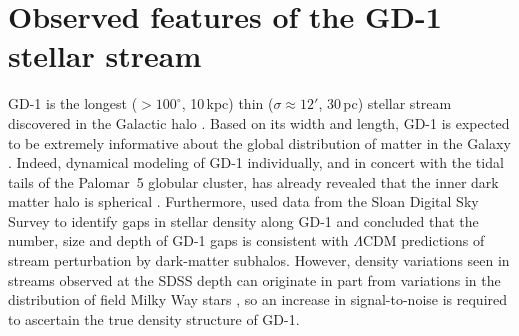 \documentclass[twocolumn]{aastex62}
\newcommand{\articlename}{\textsl{Letter}}
\newcommand{\sectionname}{Section}
\begin{document}
% 


\section{Observed features of the GD-1 stellar stream}
\label{sec:data}
GD-1 is the longest ($>100^\circ$, 10\,kpc) thin ($\sigma\approx12'$, 30\,pc) stellar stream discovered in the Galactic halo \citep{gd2006}.
Based on its width and length, GD-1 is expected to be extremely informative about the global distribution of matter in the Galaxy \citep{lux2013, bh2018}.
Indeed, dynamical modeling of GD-1 individually, and in concert with the tidal tails of the Palomar~5 globular cluster, has already revealed that the inner dark matter halo is spherical \citep{koposov2010, bowden2015, bovy2016}.
Furthermore, \citet{cg2013} used data from the Sloan Digital Sky Survey \citep[SDSS,][]{york2000} to identify gaps in stellar density along GD-1 and concluded that the number, size and depth of GD-1 gaps is consistent with $\Lambda$CDM predictions of stream perturbation by dark-matter subhalos.
However, density variations seen in streams observed at the SDSS depth can originate in part from variations in the distribution of field Milky Way stars \citep{ibata2016}, so an increase in signal-to-noise is required to ascertain the true density structure of GD-1.
\end{document}
